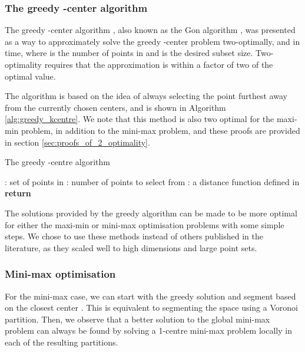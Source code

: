 \documentclass{article}
\begin{document}
\subsubsection{The greedy -center algorithm}
\label{sec:space_filling_design_greedy_k_centers}

The greedy -center algorithm \citep{dyer1985simple}, also known as the Gon algorithm \citep{garcia2019approximation}, was presented as a way to approximately solve the greedy -center problem two-optimally, and in  time, where  is the number of points in  and  is the desired subset size. Two-optimality requires that the approximation is within a factor of two of the optimal value.

The algorithm is based on the idea of always selecting the point furthest away from the currently chosen centers, and is shown in Algorithm \ref{alg:greedy_kcentre}. We note that this method is also two optimal for the maxi-min problem, in addition to the mini-max problem, and these proofs are provided in section \ref{sec:proofs_of_2_optimality}.

\begin{algorithm}
\caption{The greedy -centre algorithm}\label{alg:greedy_kcentre}
\begin{algorithmic}
\Require : set of points in 
\Require : number of points to select from  
\Require : a distance function defined in 
\State 
\State 
{}
    \State  
    \State 
\EndFor
\State \textbf{return} 
\end{algorithmic}
\end{algorithm}

The solutions provided by the greedy algorithm can be made to be more optimal for either the maxi-min or mini-max optimisation problems with some simple steps. We chose to use these methods instead of others published in the literature, as they scaled well to high dimensions and large point sets.


\subsubsection{Mini-max optimisation}
\label{sec:space_filling_design_greedy_k_centers_mini_max}

For the mini-max case, we can start with the greedy solution and segment  based on the closest center . This is equivalent to segmenting the space using a Voronoi partition. Then, we observe that a better solution to the global mini-max problem can always be found by solving a 1-centre mini-max problem locally in each of the resulting partitions. 
\end{document}
